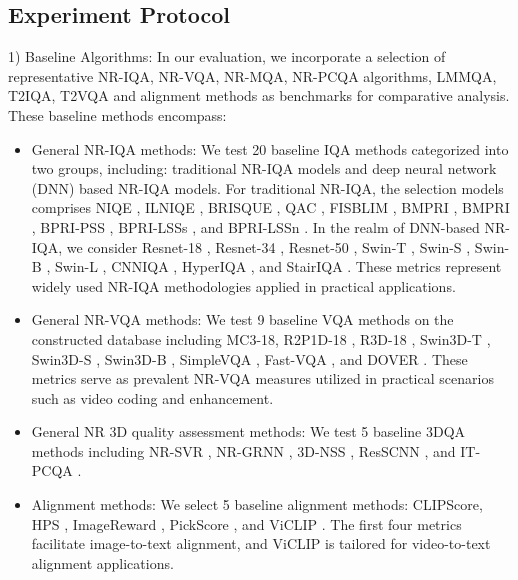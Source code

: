 \vspace{-15pt}
\subsection{Experiment Protocol}

1) Baseline Algorithms:
In our evaluation, we incorporate a selection of representative NR-IQA, NR-VQA, NR-MQA, NR-PCQA algorithms, LMMQA, T2IQA, T2VQA and alignment methods as benchmarks for comparative analysis. These baseline methods encompass:
\begin{itemize}
    \item General NR-IQA methods: We test 20 baseline IQA methods categorized into two groups, including: traditional NR-IQA models and deep neural network (DNN) based NR-IQA models. For traditional NR-IQA, the selection models comprises NIQE \cite{mittal2012making}, ILNIQE \cite{zhang2015feature}, BRISQUE \cite{mittal2012no}, QAC \cite{xue2013learning}, FISBLIM \cite{gu2013fisblim}, BMPRI \cite{min2018blind}, BMPRI \cite{min2017blind}, BPRI-PSS \cite{min2017blind}, BPRI-LSSs \cite{min2017blind}, and BPRI-LSSn \cite{min2017blind}. In the realm of DNN-based NR-IQA, we consider Resnet-18 \cite{he2016deep}, Resnet-34 \cite{he2016deep}, Resnet-50 \cite{he2016deep}, Swin-T \cite{liu2021swin}, Swin-S \cite{liu2021swin}, Swin-B \cite{liu2021swin}, Swin-L \cite{liu2021swin}, CNNIQA \cite{kang2014convolutional}, HyperIQA \cite{sun2023blind}, and StairIQA \cite{sun2023blind}. These metrics represent widely used NR-IQA methodologies applied in practical applications.
    
    \item General NR-VQA methods: We test 9 baseline VQA methods on the constructed database including MC3-18\cite{tran2018closer}, R2P1D-18 \cite{tran2018closer}, R3D-18 \cite{tran2018closer}, Swin3D-T \cite{liu2022video}, Swin3D-S \cite{liu2022video}, Swin3D-B \cite{liu2022video}, SimpleVQA \cite{sun2022a}, Fast-VQA \cite{wu2022fastquality}, and DOVER \cite{wu2023dover}. These metrics serve as prevalent NR-VQA measures utilized in practical scenarios such as video coding and enhancement.

    \item General NR 3D quality assessment methods: We test 5 baseline 3DQA methods including NR-SVR \cite{abouelaziz2016no}, NR-GRNN \cite{abouelaziz2016curvature}, 3D-NSS \cite{zhang2022no}, ResSCNN \cite{liu2023point}, and IT-PCQA \cite{yang2022no}.
    
    \item Alignment methods: We select 5 baseline alignment methods: CLIPScore\cite{hessel2021clipscore}, HPS \cite{wu2023human}, ImageReward \cite{xu2024imagereward}, PickScore \cite{kirstain2024pick}, and ViCLIP \cite{wang2023internvid}. The first four metrics facilitate image-to-text alignment, and ViCLIP is tailored for video-to-text alignment applications.


\end{itemize}
